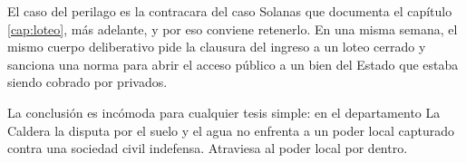 El caso del perilago es la contracara del caso Solanas que documenta el capítulo \ref{cap:loteo}, más adelante, y por eso conviene retenerlo. En una misma semana, el mismo cuerpo deliberativo pide la clausura del ingreso a un loteo cerrado y sanciona una norma para abrir el acceso público a un bien del Estado que estaba siendo cobrado por privados.

La conclusión es incómoda para cualquier tesis simple: en el departamento La Caldera la disputa por el suelo y el agua no enfrenta a un poder local capturado contra una sociedad civil indefensa. Atraviesa al poder local por dentro.
